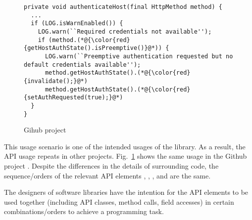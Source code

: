 \begin{figure}[t]
	\centering
\begin{lstlisting}[]
private void authenticateHost(final HttpMethod method) {
  ...
  if (LOG.isWarnEnabled()) {
    LOG.warn(``Required credentials not available'');
    if (method.(*@{\color{red}{getHostAuthState().isPreemptive()}@*)) {
      LOG.warn(``Preemptive authentication requested but no default credentials available'');
      method.getHostAuthState().(*@{\color{red}{invalidate();}@*)
      method.getHostAuthState().(*@{\color{red}{setAuthRequested(true);}@*)
  }
}
\end{lstlisting}
        \vspace{-12pt}
        \caption{Gihub project }
        \vspace{-6pt}
        \label{fig:example2}
\end{figure}

This usage scenario is one of the intended usages of the
 library. As a result, the API usage repeats in other
projects. Fig.~\ref{fig:example2} shows the same usage in the Github
project . Despite the differences in the details of
surrounding code, the sequence/orders of the relevant API elements
, , , and
 are the same.


\begin{Observation}
The designers of software libraries have the intention for the API
elements to be used together (including API classes, method calls,
field accesses) in certain combinations/orders to achieve a
programming task.
\end{Observation}


